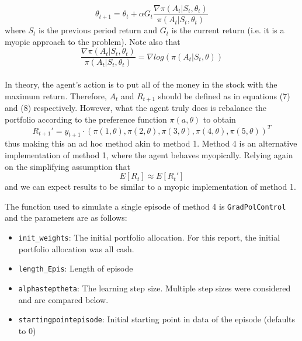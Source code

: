 \documentclass[a4paper,12pt]{article}
\newcommand{\code}[1]{\texttt{#1}}
\begin{document}
\begin{equation}
\theta_{t+1} = \theta_t + \alpha G_t \frac{\nabla \pi(A_t | S_t,\theta_t)}{\pi(A_t | S_t,\theta_t)}
\end{equation}
where $S_t$ is the previous period return and $G_t$ is the current return (i.e. it is a myopic approach to the problem). Note also that 
\begin{equation}
\frac{\nabla \pi(A_t | S_t,\theta_t)}{\pi(A_t | S_t,\theta_t)} = \nabla log(\pi(A_t|S_t,\theta))
\end{equation} \\
In theory, the agent's action is to put all of the money in the stock with the maximum return. Therefore, $A_t$ and $R_{t+1}$ should be defined as in equations (7) and (8) respectively. However, what the agent truly does is rebalance the portfolio according to the preference function $\pi(a,\theta)$ to obtain
\begin{equation}
R_{t+1}' = y_{t+1} \cdot (\pi(1,\theta),\pi(2,\theta),\pi(3,\theta),\pi(4,\theta),\pi(5,\theta))^T 
\end{equation}
thus making this an ad hoc method akin to method 1. Method 4 is  an alternative implementation of method 1, where the agent behaves myopically. Relying again on the simplifying assumption that 
$$E[R_t] \approx E[R_t']$$
and we can expect results to be similar to a myopic implementation of method 1.

The function used to simulate a single episode of method 4 is \code{GradPolControl} and the parameters are as follows:
\begin{itemize}
  \item \code{init\_weights}: The initial portfolio allocation. For this report, the initial portfolio allocation was all cash.
  \item \code{length\_Epis}: Length of episode
  \item \code{alphasteptheta}: The learning step size. Multiple step sizes were considered and are compared below.
  \item \code{startingpointepisode}: Initial starting point in data of the episode (defaults to 0)
\end{itemize}
\end{document}
